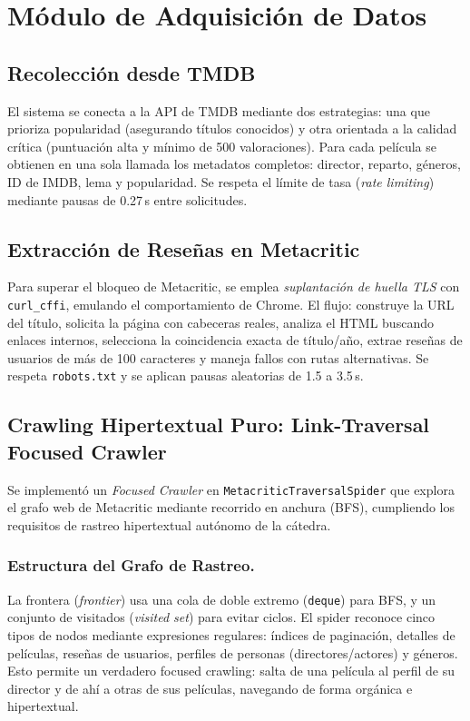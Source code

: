 \documentclass[10pt,a4paper]{llncs}
\begin{document}
\section{Módulo de Adquisición de Datos}

\subsection{Recolección desde TMDB}

El sistema se conecta a la API de TMDB mediante dos estrategias: una que prioriza popularidad (asegurando títulos conocidos) y otra orientada a la calidad crítica (puntuación alta y mínimo de 500 valoraciones). Para cada película se obtienen en una sola llamada los metadatos completos: director, reparto, géneros, ID de IMDB, lema y popularidad. Se respeta el límite de tasa (\textit{rate limiting}) mediante pausas de 0.27\,s entre solicitudes.

\subsection{Extracción de Reseñas en Metacritic}

Para superar el bloqueo de Metacritic, se emplea \textit{suplantación de huella TLS} con \texttt{curl\_cffi}, emulando el comportamiento de Chrome. El flujo: construye la URL del título, solicita la página con cabeceras reales, analiza el HTML buscando enlaces internos, selecciona la coincidencia exacta de título/año, extrae reseñas de usuarios de más de 100 caracteres y maneja fallos con rutas alternativas. Se respeta \texttt{robots.txt} y se aplican pausas aleatorias de 1.5 a 3.5\,s.

\subsection{Crawling Hipertextual Puro: Link-Traversal Focused Crawler}

Se implementó un \textit{Focused Crawler} en \texttt{MetacriticTraversalSpider} que explora el grafo web de Metacritic mediante recorrido en anchura (BFS), cumpliendo los requisitos de rastreo hipertextual autónomo de la cátedra.

\subsubsection{Estructura del Grafo de Rastreo.}

La frontera (\textit{frontier}) usa una cola de doble extremo (\texttt{deque}) para BFS, y un conjunto de visitados (\textit{visited set}) para evitar ciclos. El spider reconoce cinco tipos de nodos mediante expresiones regulares: índices de paginación, detalles de películas, reseñas de usuarios, perfiles de personas (directores/actores) y géneros. Esto permite un verdadero focused crawling: salta de una película al perfil de su director y de ahí a otras de sus películas, navegando de forma orgánica e hipertextual.
\end{document}
